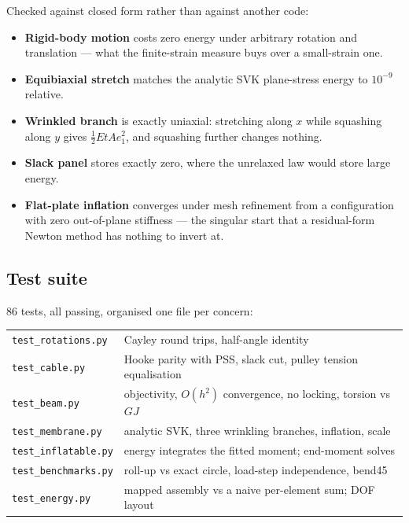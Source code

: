 \documentclass[11pt,a4paper]{article}
\newcommand{\code}[1]{\texttt{\small #1}}
\begin{document}
Checked against closed form rather than against another code:

\begin{itemize}
\item \textbf{Rigid-body motion} costs zero energy under arbitrary rotation and
translation --- what the finite-strain measure buys over a small-strain one.
\item \textbf{Equibiaxial stretch} matches the analytic SVK plane-stress energy
to $10^{-9}$ relative.
\item \textbf{Wrinkled branch} is exactly uniaxial: stretching along $x$ while
squashing along $y$ gives $\tfrac{1}{2}E t A e_1^2$, and squashing further
changes nothing.
\item \textbf{Slack panel} stores exactly zero, where the unrelaxed law would
store large energy.
\item \textbf{Flat-plate inflation} converges under mesh refinement from a
configuration with zero out-of-plane stiffness --- the singular start that a
residual-form Newton method has nothing to invert at.
\end{itemize}

\subsection{Test suite}

86 tests, all passing, organised one file per concern:

\begin{table}[H]
\centering
\begin{tabular}{ll}
\toprule
\code{test\_rotations.py} & Cayley round trips, half-angle identity\\
\code{test\_cable.py} & Hooke parity with PSS, slack cut, pulley tension equalisation\\
\code{test\_beam.py} & objectivity, $O(h^2)$ convergence, no locking, torsion vs $GJ$\\
\code{test\_membrane.py} & analytic SVK, three wrinkling branches, inflation, scale\\
\code{test\_inflatable.py} & energy integrates the fitted moment; end-moment solves\\
\code{test\_benchmarks.py} & roll-up vs exact circle, load-step independence, bend45\\
\code{test\_energy.py} & mapped assembly vs a naive per-element sum; DOF layout\\
\bottomrule
\end{tabular}
\end{table}
\end{document}

